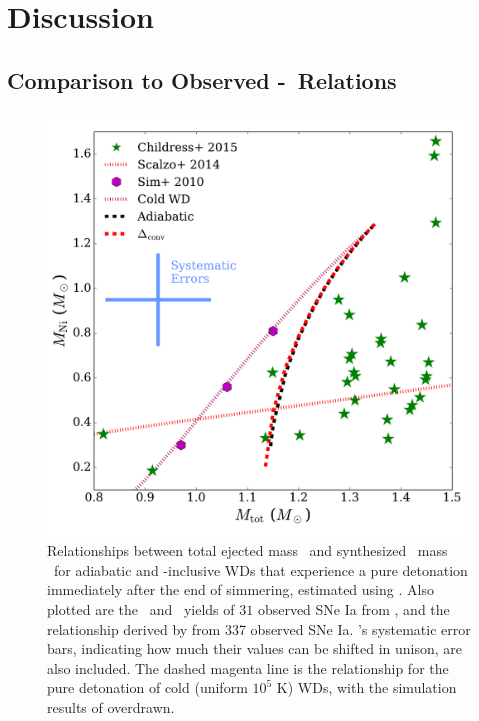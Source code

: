 \section{Discussion}
\label{sec:c5_discussion}

\subsection{Comparison to Observed \Mtot-\MNi\ Relations}
\label{ssec:c5_comparetoobs}

\begin{figure}
\centering
\includegraphics[angle=0,width=0.8\columnwidth]{chapter5_zhu+16/figures/mni.pdf}
\caption{Relationships between total ejected mass \Mtot\ and synthesized \Ni\ mass \MNi\ for adiabatic and \dnabconv-inclusive WDs that experience a pure detonation immediately after the end of simmering, estimated using \cite{sim+10}.  Also plotted are the \Mtot\ and \MNi\ yields of $31$ observed SNe Ia from \cite{chil+15}, and the relationship derived by \cite{scalzrs14} from 337 observed SNe Ia.  \cite{chil+15}'s systematic error bars, indicating how much their values can be shifted in unison, are also included.  The dashed magenta line is the relationship for the pure detonation of cold (uniform $10^5$ K) WDs, with the simulation results of \cite{sim+10} overdrawn.}
\label{fig:c5_mni}
\end{figure}


